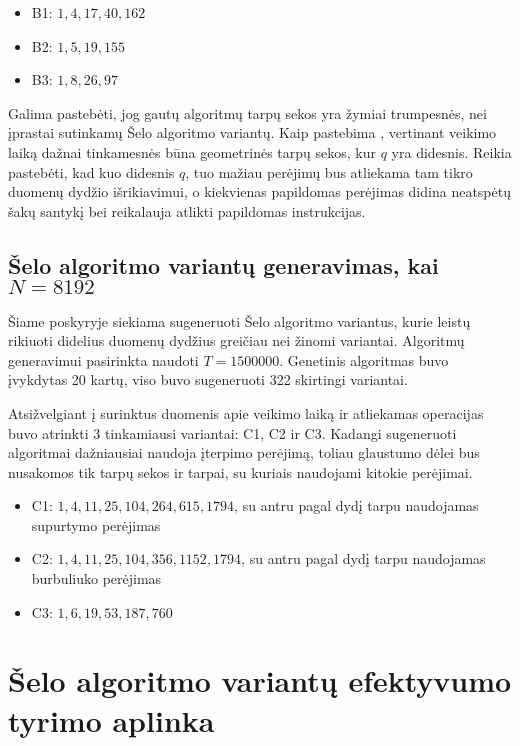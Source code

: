 \documentclass{VUMIFInfBakalaurinis}
\begin{document}
\begin{itemize}
  \item B1: $1, 4, 17, 40, 162$
  \item B2: $1, 5, 19, 155$
  \item B3: $1, 8, 26, 97 $
\end{itemize}

Galima pastebėti, jog gautų algoritmų tarpų sekos yra žymiai trumpesnės, nei įprastai sutinkamų Šelo algoritmo variantų.
Kaip pastebima \cite{Radavičius_Baranauskas_2013}, vertinant veikimo laiką dažnai tinkamesnės būna geometrinės tarpų sekos, kur $q$ yra didesnis.
Reikia pastebėti, kad kuo didesnis $q$, tuo mažiau perėjimų bus atliekama tam tikro duomenų dydžio išrikiavimui,
o kiekvienas papildomas perėjimas didina neatspėtų šakų santykį bei reikalauja atlikti papildomas instrukcijas.  

\subsection{Šelo algoritmo variantų generavimas, kai $N = 8192$}

Šiame poskyryje siekiama sugeneruoti Šelo algoritmo variantus,
kurie leistų rikiuoti didelius duomenų dydžius greičiau nei žinomi variantai.
Algoritmų generavimui pasirinkta naudoti $T = 1500000$.
Genetinis algoritmas buvo įvykdytas 20 kartų, viso buvo sugeneruoti 322 skirtingi variantai.

Atsižvelgiant į surinktus duomenis apie veikimo laiką ir atliekamas operacijas buvo atrinkti 3 tinkamiausi variantai: C1, C2 ir C3.
Kadangi sugeneruoti algoritmai dažniausiai naudoja įterpimo perėjimą, toliau glaustumo dėlei bus nusakomos tik tarpų sekos ir tarpai, su kuriais naudojami kitokie perėjimai.

\begin{itemize}
  \item C1: $1, 4, 11, 25, 104, 264, 615, 1794$, su antru pagal dydį tarpu naudojamas supurtymo perėjimas
  \item C2: $1, 4, 11, 25, 104, 356, 1152, 1794$, su antru pagal dydį tarpu naudojamas burbuliuko perėjimas
  \item C3: $1, 6, 19, 53, 187, 760 $
\end{itemize}

\section{Šelo algoritmo variantų efektyvumo tyrimo aplinka}
\end{document}

